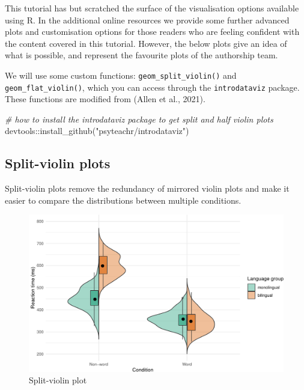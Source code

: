 \documentclass[
  english,
  doc,floatsintext]{apa6}
\newenvironment{Shaded}{\begin{snugshade}}{\end{snugshade}}
\newcommand{\CommentTok}[1]{\textcolor[rgb]{0.56,0.35,0.01}{\textit{#1}}}
\newcommand{\FunctionTok}[1]{\textcolor[rgb]{0.00,0.00,0.00}{#1}}
\newcommand{\NormalTok}[1]{#1}
\newcommand{\SpecialCharTok}[1]{\textcolor[rgb]{0.00,0.00,0.00}{#1}}
\newcommand{\StringTok}[1]{\textcolor[rgb]{0.31,0.60,0.02}{#1}}
\begin{document}
This tutorial has but scratched the surface of the visualisation options available using R. In the additional online resources we provide some further advanced plots and customisation options for those readers who are feeling confident with the content covered in this tutorial. However, the below plots give an idea of what is possible, and represent the favourite plots of the authorship team.

We will use some custom functions: \texttt{geom\_split\_violin()} and \texttt{geom\_flat\_violin()}, which you can access through the \texttt{introdataviz} package. These functions are modified from (Allen et al., 2021).

\begin{Shaded}
\begin{Highlighting}[]
\CommentTok{\# how to install the introdataviz package to get split and half violin plots}
\NormalTok{devtools}\SpecialCharTok{::}\FunctionTok{install\_github}\NormalTok{(}\StringTok{"psyteachr/introdataviz"}\NormalTok{)}
\end{Highlighting}
\end{Shaded}

\hypertarget{split-violin-plots}{%
\subsection{Split-violin plots}\label{split-violin-plots}}

Split-violin plots remove the redundancy of mirrored violin plots and make it easier to compare the distributions between multiple conditions.

\begin{figure}

{\centering \includegraphics[width=1\linewidth]{images/splitviolin-1} 

}

\caption{Split-violin plot}\label{fig:splitviolin}
\end{figure}
\end{document}

